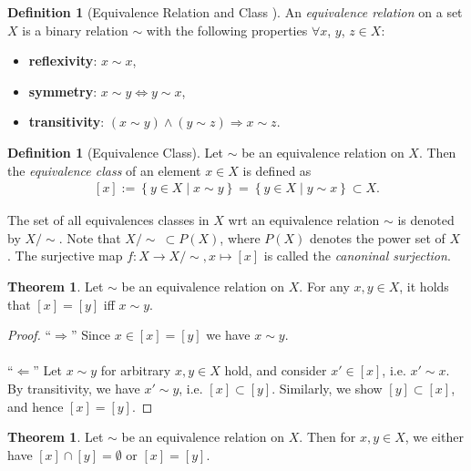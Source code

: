 \documentclass[12pt, a4paper]{article}
\numberwithin{equation}{section}
\theoremstyle{definition}
\theoremstyle{definition}
\newtheorem{defn}[thm]{Definition} %
\newtheorem{theorem}[thm]{Theorem}
\begin{document}
	\begin{defn}[Equivalence Relation and Class \cite{equivalence_relation}]\label{defn:equivalence_relation}
		An \textit{equivalence relation} on a set $X$ is a binary relation $\sim$ with the following properties $\forall x$, $y$, $z \in X$: 
		\begin{itemize}
			\item \textbf{reflexivity}: $x\sim x$, 
			\item \textbf{symmetry}: $x \sim y\Leftrightarrow y\sim x$, 
			\item  \textbf{transitivity}: $\left(x\sim y\right) \wedge \left(y\sim z\right)\Rightarrow x\sim z$.  
		\end{itemize}
	\end{defn}

	\begin{defn}[Equivalence Class]
		Let $\sim$ be an equivalence relation on $X$. Then the \textit{equivalence class} of an element $x\in X$ is defined as 
		\begin{align}
			\left[x\right] := \left\{y\in X \mid x\sim y \right\} = \left\{ y\in X \mid y\sim x \right\} \subset X. 
		\end{align}
	
		The set of all equivalences classes in $X$ wrt an equivalence relation $\sim$ is denoted by $X/\sim$. Note that $X/\sim\ \subset P(X)$, where $P(X)$ denotes the power set of $X$ \cite{src:quotient_set_X_by_equivalence_relation}. The surjective map $f: X\rightarrow X/\sim, x\mapsto [x]$ is called the \textit{canoninal surjection}.
	\end{defn}

	\begin{theorem}\label{thrm:characterization_equivalence_classes}
		Let $\sim$ be an equivalence relation on $X$. For any $x, y\in X$, it holds that $[x] = [y]$ iff $x\sim y$.
	\end{theorem}
	
	\begin{proof}
		\enquote{$\Longrightarrow$} Since $x\in[x] = [y]$ we have $x\sim y$.
		\\ \\
		\enquote{$\Longleftarrow$} Let $x\sim y$ for arbitrary $x, y\in X$ hold, and consider $x'\in [x]$, i.e. $x'\sim x$. By transitivity, we have $x' \sim y$, i.e. $[x] \subset [y]$. Similarly, we show $[y]\subset [x]$, and hence $[x] = [y]$.
	\end{proof}

	\begin{theorem}
		Let $\sim$ be an equivalence relation on $X$. Then for $x, y\in X$, we either have $[x] \cap [y] = \emptyset$ or $[x] = [y]$.
	\end{theorem}
\end{document}
